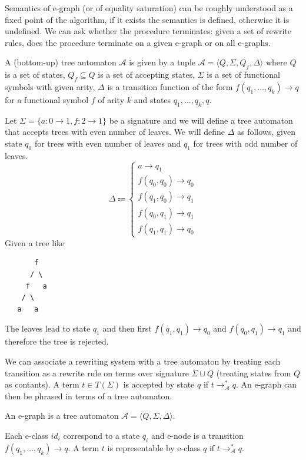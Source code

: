 \documentclass[acmsmall,screen, nonacm, anonymous]{acmart}
\begin{document}
Semantics of e-graph (or of equality saturation) can be roughly understood as a fixed point of the algorithm, if it exists the semantics is defined, otherwise it is undefined.
We can ask whether the procedure terminates: given a set of rewrite rules, does the procedure terminate on a given e-graph or on all e-graphs.

\begin{definition}
  A (bottom-up) tree automaton $\mathcal{A}$ is given by a tuple $\mathcal{A} = \langle Q, \Sigma, Q_{f}, \Delta \rangle$ where $Q$ is a set of states, $Q_{f} \subseteq Q$ is a set of accepting states, $\Sigma$ is a set of functional symbols with given arity, $\Delta$ is a transition function of the form $f(q_1,\ldots,q_k) \to q$ for a functional symbol $f$ of arity $k$ and states $q_1, \ldots, q_k, q$.
\end{definition}

\begin{example}
  Let $\Sigma = \{a : 0 \to 1, f : 2 \to 1\}$ be a signature and we will define a tree automaton that accepts trees with even number of leaves.
  We will define $\Delta$ as follows, given state $q_0$ for trees with even number of leaves and $q_1$ for trees with odd number of leaves.
  \[
  \Delta \Coloneq \begin{cases}
    a \to q_{1}\\
    f(q_0,q_0) \to q_{0}\\
    f(q_1,q_0) \to q_{1}\\
    f(q_0,q_1) \to q_{1}\\
    f(q_1,q_1) \to q_{0}
  \end{cases}
  \]
  Given a tree like
  \begin{center}
  \begin{verbatim}
       f
      / \
     f   a
    / \
   a   a
  \end{verbatim}
\end{center}

The leaves lead to state $q_1$ and then first $f(q_1,q_1) \to q_{0}$ and $f(q_0,q_1) \to q_{1}$ and therefore the tree is rejected.
\end{example}

We can associate a rewriting system with a tree automaton by treating each transition as a rewrite rule on terms over signature $\Sigma \cup Q$ (treating states from $Q$ as contants).
A term $t \in T(\Sigma)$ is accepted by state $q$ if $t \to^{*}_{\mathcal{A}} q$.
An e-graph can then be phrased in terms of a tree automaton.
\begin{definition}
  An e-graph is a tree automaton $\mathcal{A} = \langle Q, \Sigma, \Delta \rangle$.
\end{definition}
Each e-class $id_i$ correspond to a state $q_i$ and e-node is a transition $f(q_1,\ldots,q_k) \to q$.
A term $t$ is representable by e-class $q$ if $t \to^{*}_{\mathcal{A}} q$.
\end{document}
